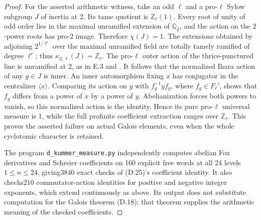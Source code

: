 \begin{proof}
For the asserted arithmetic witness, take an odd $\ell$ and a pro-$\ell$ Sylow subgroup $J$ of inertia at 2. Its tame quotient is $\mathbb Z_\ell(1)$. Every root of unity of odd order lies in the maximal unramified extension of $\mathbb Q_2$, and the action on the $2$-power roots has pro-$2$ image. Therefore $\chi(J)=1$. The extensions obtained by adjoining $2^{1/\ell^r}$ over the maximal unramified field are totally tamely ramified of degree $\ell^r$; thus $\kappa_{2,\ell}(J)=\mathbb Z_\ell$. The pro-$\ell$ outer action of the thrice-punctured line is unramified at 2, as in E.3 and \cite[\S8.4]{E_HainMatsumoto}. It follows that the normalized Ihara action of any $g\in J$ is inner. An inner automorphism fixing $x$ has conjugator in the centralizer $\langle x\rangle$. Comparing its action on $y$ with $f_g^{-1}yf_g$, where $f_g\in F_\ell'$, shows that $f_g$ differs from a power of $x$ by a power of $y$. Abelianization forces both powers to vanish, so this normalized action is the identity. Hence its pure pro-$\ell$ universal measure is 1, while the full profinite coefficient extraction ranges over $\mathbb Z_\ell$. This proves the asserted failure on actual Galois elements, even when the whole cyclotomic character is retained.

The program \texttt{d\_kummer\_measure.py} independently computes abelian Fox derivatives and Schreier coefficients on 160 explicit free words at all 24 levels $1\leq n\leq24$, giving3840 exact checks of (D.25)'s coefficient identity. It also checks210 commutator-action identities for positive and negative integer exponents, which extend continuously as above. Its output does not substitute computation for the Galois theorem (D.18); that theorem supplies the arithmetic meaning of the checked coefficients.
\end{proof}
